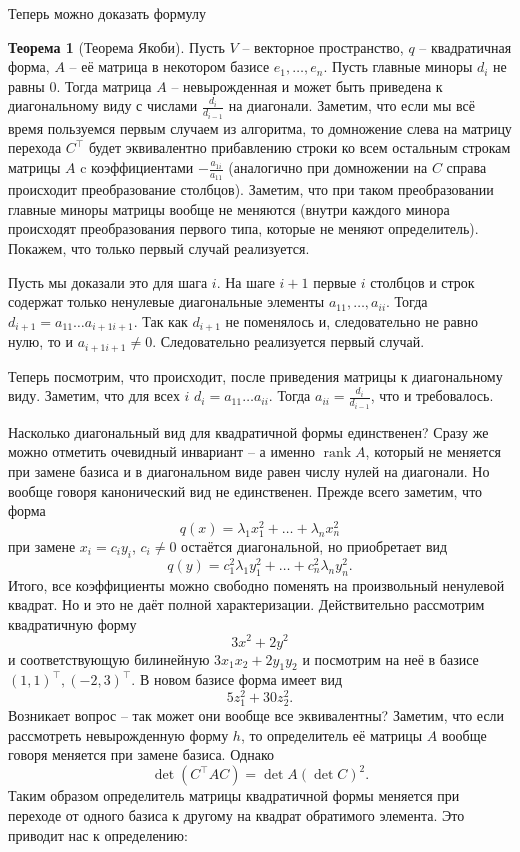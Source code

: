 \documentclass[10pt,a4paper,oneside]{book}
\theoremstyle{definition}
\newtheorem{thm}{Теорема}
\newcommand{\rank}{\operatorname{rank}}
\def\thrm{\begin{thm}}
\def\ethrm{\end{thm}}
\begin{document}
Теперь можно доказать формулу 
\thrm[Теорема Якоби]
Пусть $V$ -- векторное пространство, $q$ -- квадратичная форма, $A$ -- её матрица в некотором базисе $e_1,\dots,e_n$. Пусть главные миноры $d_i$ не равны 0. 
Тогда матрица $A$ -- невырожденная и может быть приведена к диагональному виду с числами $\frac{d_{i}}{d_{i-1}}$ на диагонали.
\proof Заметим, что если мы всё время пользуемся первым случаем из алгоритма, то домножение слева на матрицу перехода $C^{\top}$ будет эквивалентно прибавлению строки ко всем остальным строкам матрицы $A$ c коэффициентами $-\frac{a_{1i}}{a_{11}}$ (аналогично при домножении на $C$ справа происходит преобразование столбцов). Заметим, что при таком преобразовании главные миноры матрицы вообще не меняются (внутри каждого минора происходят преобразования первого типа, которые не меняют определитель). Покажем, что только первый случай реализуется. 

Пусть мы доказали это для шага $i$. На шаге $i+1$ первые $i$ столбцов и строк содержат только ненулевые диагональные элементы $a_{11},\dots, a_{ii}$. Тогда $d_{i+1}=a_{11}\dots a_{i+1 i+1}$. Так как $d_{i+1}$ не  поменялось и, следовательно не равно нулю, то и $a_{i+1 i+1} \neq 0$. Следовательно реализуется первый случай. 

Теперь посмотрим, что происходит, после приведения матрицы к диагональному виду. Заметим, что для всех $i$ $d_i=a_{11}\dots a_{ii}$. Тогда $a_{ii}=\frac{d_i}{d_{i-1}}$, что и требовалось.
\endproof
\ethrm




Насколько диагональный вид для квадратичной формы единственен? Сразу же можно отметить очевидный инвариант -- а именно $\rank A$, который не меняется при замене базиса и в диагональном виде равен числу нулей на диагонали. Но вообще говоря канонический вид не единственен. Прежде всего заметим, что форма 
$$q(x)=\lambda_1 x_1^2+\dots+\lambda_nx_n^2$$
при замене $x_i=c_i y_i$, $c_i\neq 0$ остаётся диагональной, но приобретает вид 
$$q(y)=c_1^2\lambda_1y_1^2+\dots+c_n^2\lambda_ny_n^2.$$
Итого, все коэффициенты можно свободно поменять на произвольный ненулевой квадрат. Но и это не даёт полной характеризации. Действительно  рассмотрим квадратичную форму
$$3x^2+2y^2$$
и соответствующую билинейную $3x_1x_2+2y_1y_2$ и посмотрим на неё в базисе $(1,1)^{\top}, (-2,3)^{\top}$. В новом базисе форма имеет вид
$$5z_1^2+30z_2^2.$$
Возникает вопрос -- так может они вообще все эквивалентны? Заметим, что если рассмотреть невырожденную форму $h$, то определитель её матрицы $A$ вообще говоря меняется при замене базиса. Однако 
$$\det(C^{\top}AC)=\det A (\det C)^2.$$
Таким образом определитель матрицы квадратичной формы меняется при переходе от одного базиса к другому на квадрат обратимого элемента. Это приводит нас к определению:
\end{document}
